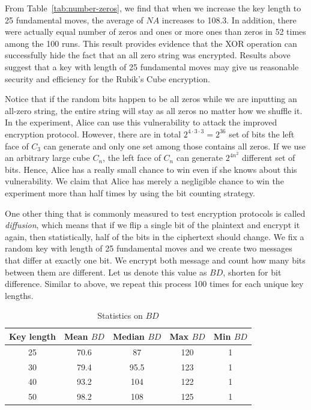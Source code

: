 From Table~\ref{tab:number-zeros}, we find that when we increase the key length to 25 fundamental moves, the average of $NA$ increases to 108.3. In addition, there were actually equal number of zeros and ones or more ones than zeros in 52 times among the 100 runs. This result provides evidence that the XOR operation can successfully hide the fact that an all zero string was encrypted. Results above suggest that a key with length of 25 fundamental moves may give us reasonable security and efficiency for the Rubik's Cube encryption.
\par Notice that if the random bits happen to be all zeros while we are inputting an all-zero string, the entire string will stay as all zeros no matter how we shuffle it. In the experiment, Alice can use this vulnerability to attack the improved encryption protocol. However, there are in total $2^{4 \cdot 3 \cdot 3} = 2^{36}$ set of bits the left face of $C_3$ can generate and only one set among those contains all zeros. If we use an arbitrary large cube $C_n$, the left face of $C_n$ can generate $2^{4n^2}$ different set of bits. Hence, Alice has a really small chance to win even if she knows about this vulnerability. We claim that Alice has merely a negligible chance to win the experiment more than half times by using the bit counting strategy.
\par One other thing that is commonly measured to test encryption protocols is called \textit{diffusion}, which means that if we flip a single bit of the plaintext and encrypt it again, then statistically, half of the bits in the ciphertext should change. We fix a random key with length of 25 fundamental moves and we create two messages that differ at exactly one bit. We encrypt both message and count how many bits between them are different. Let us denote this value as $BD$, shorten for bit difference. Similar to above, we repeat this process 100 times for each unique key lengths.
\begin{table}[ht]
    \centering
    \begin{tabular}{|c|c|c|c|c|}
        \hline Key length & Mean $BD$ & Median $BD$ & Max $BD$ & Min $BD$ \\
        \hline 25 & 70.6 & 87 & 120 & 1 \\
        \hline 30 & 79.4 & 95.5 & 123 & 1 \\
        \hline 40 & 93.2 & 104 & 122 & 1 \\
        \hline 50 & 98.2 & 108 & 125 & 1 \\ \hline
    \end{tabular}
    \caption{Statistics on $BD$}
    \label{tab:bit-difference}
\end{table}

